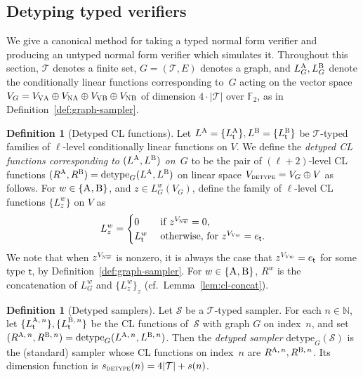 \documentclass[11pt]{article}
\theoremstyle{definition}
\newtheorem{definition}[theorem]{Definition}
\newcommand{\N}{\ensuremath{\mathbb{N}}}
\newcommand{\F}{\ensuremath{\mathbb{F}}}
\newcommand{\sampler}{\mathcal{S}}
\newcommand{\detype}{\mathrm{detype}}
\newcommand{\type}{\mathcal{T}}
\newcommand{\gamestyle}[1]{\ensuremath{\textsc{#1}}\xspace}
\newcommand{\labelstyle}[1]{\ensuremath{\textsc{#1}}\xspace}
\newcommand{\vertex}[1]{\labelstyle{V#1}}
\newcommand{\edge}[1]{\labelstyle{N#1}}
\newcommand{\tvarstyle}[1]{\mathsf{#1}}
\newcommand{\tvar}{\ensuremath{\tvarstyle{t}}}
\newcommand{\alice}{\labelstyle{A}}
\newcommand{\bob}{\labelstyle{B}}
\begin{document}
\subsection{Detyping typed verifiers}
\label{sec:detype}  

We give a canonical method for taking a typed normal form verifier and producing
an untyped normal form verifier which simulates it.
Throughout this section, $\type$ denotes a finite set, $G = (\type, E)$ denotes
a graph, and $L_G^\alice, L_G^\bob$ denote the conditionally linear functions
corresponding to~$G$ acting on the vector space $V_G = V_{\vertex{\alice}}
\oplus V_{\edge{\alice}} \oplus V_{\vertex{\bob}} \oplus V_{\edge{\bob}}$ of
dimension $4\cdot |\type|$ over $\F_2$, as in
Definition~\ref{def:graph-sampler}.

\begin{definition}[Detyped CL functions]
  \label{def:detyped-CL}
  Let $L^\alice = \{L^{\alice}_{\tvar}\}, L^\bob = \{L^{\bob}_{\tvar}\}$ be
  $\type$-typed families of $\ell$-level conditionally linear functions on $V$.
  We define the \emph{detyped CL functions corresponding to $(L^\alice, L^\bob)$
    on~$G$} to be the pair of $(\ell+2)$-level CL functions $(R^\alice, R^\bob)
  = \detype_G(L^\alice, L^\bob)$ on linear space $V_{\gamestyle{detype}} = V_G
  \oplus V$ as follows.
  For $w \in \{\alice, \bob\}$, and $z \in L^w_G (V_G)$, define the family of
  $\ell$-level CL functions $\{L^w_z\}$ on $V$ as
  \begin{equation*}
    L^w_z =
    \begin{cases}
      0 & \text{ if } z^{V_{\edge{}\overline{w}}} = 0,\\
      L^w_\tvar & \text { otherwise, for } z^{V_{\vertex{}w}} = e_\tvar.
    \end{cases}
  \end{equation*}
  We note that when $z^{V_{\edge{}\overline{w}}}$ is nonzero, it is always the
  case that $z^{V_{\vertex{}w}} = e_\tvar$ for some type $\tvar$, by Definition~\ref{def:graph-sampler}.
  For $w\in \{\alice, \bob\}$, $R^w$ is the concatenation of $L^w_G$ and
  $\{L^w_z\}_z$ (cf.\ Lemma~\ref{lem:cl-concat}).
\end{definition}

\begin{definition}[Detyped samplers]
  Let $\sampler$ be a $\type$-typed sampler.
  For each $n \in \N$, let $\{L^{\alice,\, n}_\tvar\}, \{L^{\bob,\, n}_\tvar\}$
  be the CL functions of~$\sampler$ with graph $G$ on index~$n$, and set
  $(R^{\alice,\, n}, R^{\bob,\, n}) = \detype_G(L^{\alice,\, n}, L^{\bob,\,
    n})$.
  Then the \emph{detyped sampler} $\detype_G(\sampler)$ is the (standard)
  sampler whose CL functions on index~$n$ are $R^{\alice,\, n}, R^{\bob,\, n}$.
  Its dimension function is $s_{\gamestyle{detype}}(n) = 4|\type|+s(n)$.
\end{definition}
\end{document}
